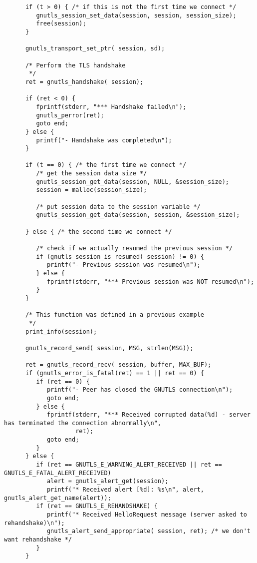\begin{verbatim}
      if (t > 0) { /* if this is not the first time we connect */
         gnutls_session_set_data(session, session, session_size);
         free(session);
      }
      
      gnutls_transport_set_ptr( session, sd);

      /* Perform the TLS handshake
       */
      ret = gnutls_handshake( session);

      if (ret < 0) {
         fprintf(stderr, "*** Handshake failed\n");
         gnutls_perror(ret);
         goto end;
      } else {
         printf("- Handshake was completed\n");
      }

      if (t == 0) { /* the first time we connect */
         /* get the session data size */
         gnutls_session_get_data(session, NULL, &session_size);
         session = malloc(session_size);

         /* put session data to the session variable */
         gnutls_session_get_data(session, session, &session_size);

      } else { /* the second time we connect */

         /* check if we actually resumed the previous session */
         if (gnutls_session_is_resumed( session) != 0) {
            printf("- Previous session was resumed\n");
         } else {
            fprintf(stderr, "*** Previous session was NOT resumed\n");
         }
      }

      /* This function was defined in a previous example
       */
      print_info(session);

      gnutls_record_send( session, MSG, strlen(MSG));

      ret = gnutls_record_recv( session, buffer, MAX_BUF);
      if (gnutls_error_is_fatal(ret) == 1 || ret == 0) {
         if (ret == 0) {
            printf("- Peer has closed the GNUTLS connection\n");
            goto end;
         } else {
            fprintf(stderr, "*** Received corrupted data(%d) - server has terminated the connection abnormally\n",
                    ret);
            goto end;
         }
      } else {
         if (ret == GNUTLS_E_WARNING_ALERT_RECEIVED || ret == GNUTLS_E_FATAL_ALERT_RECEIVED)
            alert = gnutls_alert_get(session);
            printf("* Received alert [%d]: %s\n", alert, gnutls_alert_get_name(alert));
         if (ret == GNUTLS_E_REHANDSHAKE) {
            printf("* Received HelloRequest message (server asked to rehandshake)\n");
            gnutls_alert_send_appropriate( session, ret); /* we don't want rehandshake */
         }
      }


\end{verbatim}
